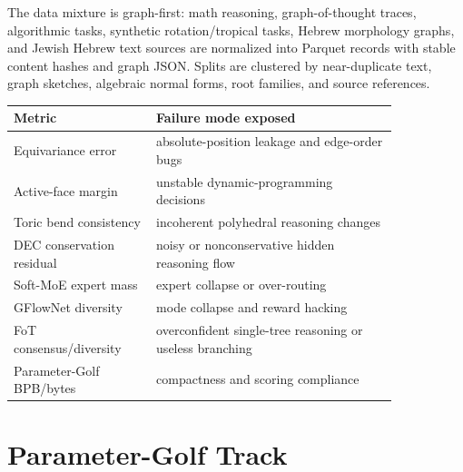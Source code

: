 \documentclass[10pt]{article}
\theoremstyle{definition}
\theoremstyle{plain}
\theoremstyle{remark}
\begin{document}
The data mixture is graph-first: math reasoning, graph-of-thought traces, algorithmic tasks, synthetic rotation/tropical tasks, Hebrew morphology graphs, and Jewish Hebrew text sources are normalized into Parquet records with stable content hashes and graph JSON.  Splits are clustered by near-duplicate text, graph sketches, algebraic normal forms, root families, and source references.

\begin{center}
\begin{tabular}{p{0.31\linewidth}p{0.53\linewidth}}
\toprule
Metric & Failure mode exposed \\
\midrule
Equivariance error & absolute-position leakage and edge-order bugs \\
Active-face margin & unstable dynamic-programming decisions \\
Toric bend consistency & incoherent polyhedral reasoning changes \\
DEC conservation residual & noisy or nonconservative hidden reasoning flow \\
Soft-MoE expert mass & expert collapse or over-routing \\
GFlowNet diversity & mode collapse and reward hacking \\
FoT consensus/diversity & overconfident single-tree reasoning or useless branching \\
Parameter-Golf BPB/bytes & compactness and scoring compliance \\
\bottomrule
\end{tabular}
\end{center}

\section{Parameter-Golf Track}
\end{document}
